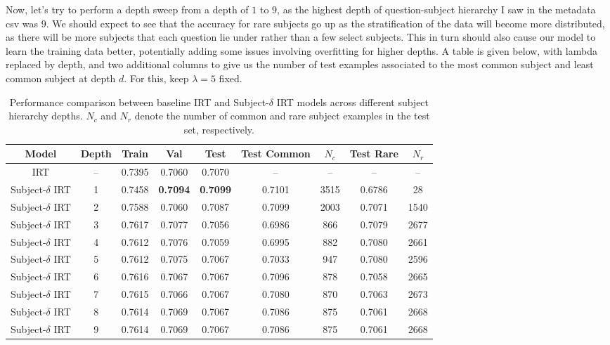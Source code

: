 \documentclass[11pt]{article}
\begin{document}
Now, let's try to perform a depth sweep from a depth of $1$ to $9$, as the highest depth of question-subject hierarchy I saw in the metadata csv was $9$. We should expect to see that the accuracy for rare subjects go up as the stratification of the data will become more distributed, as there will be more subjects that each question lie under rather than a few select subjects. This in turn should also cause our model to learn the training data better, potentially adding some issues involving overfitting for higher depths. A table is given below, with lambda replaced by depth, and two additional columns to give us the number of test examples associated to the most common subject and least common subject at depth $d$. For this, keep $\lambda = 5$ fixed.

\begin{table}[H]
\centering
\small
\setlength{\tabcolsep}{4pt}
\begin{tabular}{c|c|ccc|cc|cc}
\hline
\textbf{Model} & \textbf{Depth}
& \textbf{Train} & \textbf{Val} & \textbf{Test}
& \textbf{Test Common} & \textbf{$N_c$}
& \textbf{Test Rare} & \textbf{$N_r$} \\
\hline
IRT & --
& 0.7395 & 0.7060 & 0.7070
& -- & --
& -- & -- \\

Subject-$\delta$ IRT & 1
& 0.7458 & \textbf{0.7094} & \textbf{0.7099}
& 0.7101 & 3515
& 0.6786 & 28 \\

Subject-$\delta$ IRT & 2
& 0.7588 & 0.7060 & 0.7087
& 0.7099 & 2003
& 0.7071 & 1540 \\

Subject-$\delta$ IRT & 3
& 0.7617 & 0.7077 & 0.7056
& 0.6986 & 866
& 0.7079 & 2677 \\

Subject-$\delta$ IRT & 4
& 0.7612 & 0.7076 & 0.7059
& 0.6995 & 882
& 0.7080 & 2661 \\

Subject-$\delta$ IRT & 5
& 0.7612 & 0.7075 & 0.7067
& 0.7033 & 947
& 0.7080 & 2596 \\

Subject-$\delta$ IRT & 6
& 0.7616 & 0.7067 & 0.7067
& 0.7096 & 878
& 0.7058 & 2665 \\

Subject-$\delta$ IRT & 7
& 0.7615 & 0.7066 & 0.7067
& 0.7080 & 870
& 0.7063 & 2673 \\

Subject-$\delta$ IRT & 8
& 0.7614 & 0.7069 & 0.7067
& 0.7086 & 875
& 0.7061 & 2668 \\

Subject-$\delta$ IRT & 9
& 0.7614 & 0.7069 & 0.7067
& 0.7086 & 875
& 0.7061 & 2668 \\

\hline
\end{tabular}
\caption{Performance comparison between baseline IRT and Subject-$\delta$ IRT models across different subject hierarchy depths. $N_c$ and $N_r$ denote the number of common and rare subject examples in the test set, respectively.}
\label{tab:subject_delta_results}
\end{table}
\end{document}
